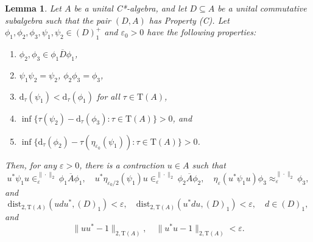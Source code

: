 \documentclass[10pt,a4paper]{amsart}
\newtheorem{lem}{Lemma}
\newcommand{\eps}{\varepsilon}
\newcommand{\norm}[1]{\| #1\|}
\newcommand{\tr}{\mathrm{T}}
\begin{document}
\begin{lem}\label{D-sandwich}
Let $A$ be a unital C*-algebra, and let $D \subseteq A$ be a unital commutative subalgebra such that the pair $(D, A)$ has Property (C). Let $\phi_1, \phi_2, \phi_3, \psi_1, \psi_2 \in (D)_1^+$ and $\eps_0>0$ have the following properties:
\begin{enumerate}
\item\label{cond-s-1} $\phi_2, \phi_3 \in \overline{\phi_1 D\phi_1}$,
\item\label{cond-s-2} $\psi_1\psi_2 = \psi_2$, $\phi_2 \phi_3 = \phi_3$,
\item\label{cond-s-3} $\mathrm{d}_\tau(\psi_1) < \mathrm{d}_\tau(\phi_1)$ for all $\tau\in\tr(A)$,
\item\label{cond-s-4} $\inf\{\tau(\psi_2) - \mathrm{d}_\tau(\phi_3): \tau \in \tr(A)\} >0 $, and
\item\label{cond-s-5} $\inf\{\mathrm{d}_\tau(\phi_2) - \tau(\eta_{\eps_0}(\psi_1)): \tau \in \tr(A)\} >0 $.  \end{enumerate}
Then, for any $\eps>0$, there is a contraction $u\in A$ such that
$$ u^*\psi_1u \in_\eps^{\norm{\cdot}_2}  \overline{\phi_1A\phi_1},\quad u^*\eta_{\eps_0/2}(\psi_1)u \in^{\norm{\cdot}_2}_{\eps} \overline{\phi_2A\phi_2}, \quad  \eta_{\eps}(u^*\psi_1u) \phi_3 \approx_{\eps}^{\norm{\cdot}_2} \phi_3,$$
and
$$\mathrm{dist}_{2, \tr(A)}(udu^*, (D)_1) < \eps,\quad \mathrm{dist}_{2, \tr(A)}(u^*du, (D)_1) < \eps,\quad d \in (D)_1,$$
and
$$\norm{uu^* - 1}_{2, \tr(A)}, \quad \norm{u^*u - 1}_{2, \tr(A)} < \eps.$$
\end{lem}
\end{document}
